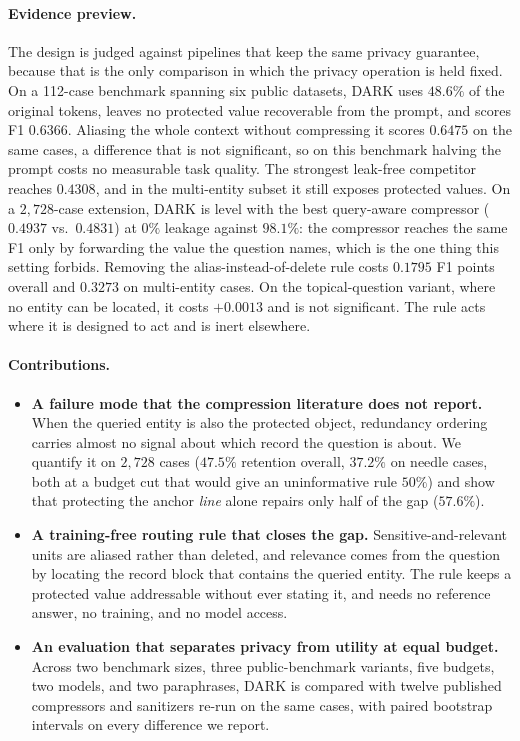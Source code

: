 \paragraph{Evidence preview.}
The design is judged against pipelines that keep the same privacy guarantee, because that is
the only comparison in which the privacy operation is held fixed. On a 112-case benchmark
spanning six public datasets, \textsc{DARK} uses $48.6\%$ of the original tokens, leaves no
protected value recoverable from the prompt, and scores F1 $0.6366$. Aliasing the whole
context without compressing it scores $0.6475$ on the same cases, a difference that is not
significant, so on this benchmark halving the prompt costs no measurable task quality. The
strongest leak-free competitor reaches $0.4308$, and in the multi-entity subset it still
exposes protected values. On a $2{,}728$-case extension, \textsc{DARK} is level with the best
query-aware compressor ($0.4937$ vs.\ $0.4831$) at $0\%$ leakage against $98.1\%$: the
compressor reaches the same F1 only by forwarding the value the question names, which is the
one thing this setting forbids. Removing the alias-instead-of-delete rule costs $0.1795$ F1
points overall and $0.3273$ on multi-entity cases. On the topical-question variant, where no
entity can be located, it costs $+0.0013$ and is not significant. The rule acts where it is
designed to act and is inert elsewhere.

\paragraph{Contributions.}
\begin{itemize}
\item \textbf{A failure mode that the compression literature does not report.} When the
queried entity is also the protected object, redundancy ordering carries almost no signal
about which record the question is about. We quantify it on $2{,}728$ cases ($47.5\%$
retention overall, $37.2\%$ on needle cases, both at a budget cut that would give an
uninformative rule $50\%$) and show that protecting the anchor \emph{line} alone repairs only
half of the gap ($57.6\%$).
\item \textbf{A training-free routing rule that closes the gap.} Sensitive-and-relevant units
are aliased rather than deleted, and relevance comes from the question by locating the record
block that contains the queried entity. The rule keeps a protected value addressable without
ever stating it, and needs no reference answer, no training, and no model access.
\item \textbf{An evaluation that separates privacy from utility at equal budget.} Across two
benchmark sizes, three public-benchmark variants, five budgets, two models, and two
paraphrases, \textsc{DARK} is compared with twelve published compressors and sanitizers
re-run on the same cases, with paired bootstrap intervals on every difference we report.
\end{itemize}


